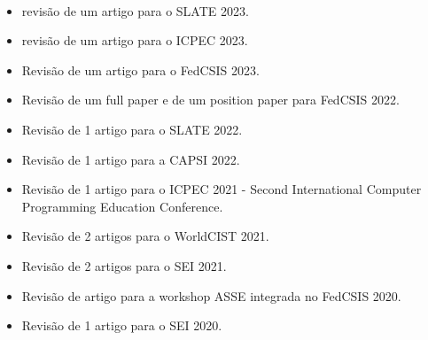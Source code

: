 \documentclass[11pt]{article}
\begin{document}
\\
\begin{itemize}
\item {revisão de um artigo para o SLATE 2023.}
\item {revisão de um artigo para o ICPEC 2023.}
\item {Revisão de um artigo para o FedCSIS 2023.}
\item {Revisão de um full paper e de um position paper para FedCSIS 2022.}
\item {Revisão de 1 artigo para o SLATE 2022.}
\item {Revisão de 1 artigo para a CAPSI 2022.}
\item {Revisão de 1 artigo para o ICPEC 2021 - Second International Computer Programming Education Conference.}
\item {Revisão de 2 artigos para o WorldCIST 2021.}
\item {Revisão de 2 artigos para o SEI 2021.}
\item {Revisão de artigo para a workshop ASSE integrada no FedCSIS 2020.}
\item {Revisão de 1 artigo para o SEI 2020.}


\end{itemize}
\end{document}
